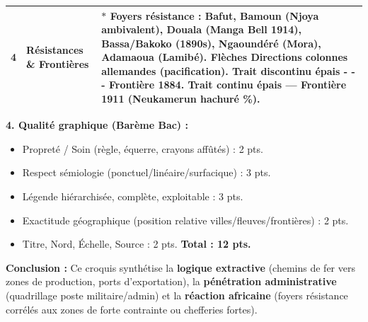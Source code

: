 \documentclass[11pt]{article}
\def\star{\mathbin{\ast}}\def\bigstar{\mathord{\ast}}%
\begin{document}
\begin{exoresolu}
\begin{center}
\begin{tabular}{|l|l|l|}
\hline
4 & \textbf{Résistances \& Frontières} & \textcolor{popred}{$\star$} Foyers résistance : Bafut, Bamoun (Njoya ambivalent), Douala (Manga Bell 1914), Bassa/Bakoko (1890s), Ngaoundéré (Mora), Adamaoua (Lamibé). \textcolor{popred}{\textbf{Flèches}} Directions colonnes allemandes (pacification). \textbf{Trait discontinu épais \textcolor{popblue}{- - -}} Frontière 1884. \textbf{Trait continu épais \textcolor{popdark}{—}} Frontière 1911 (Neukamerun hachuré \textcolor{popgray}{\%}). \\
\hline
\end{tabular}
\end{center}
\textbf{4. Qualité graphique (Barème Bac) :}
\begin{itemize}
    \item Propreté / Soin (règle, équerre, crayons affûtés) : 2 pts.
    \item Respect sémiologie (ponctuel/linéaire/surfacique) : 3 pts.
    \item Légende hiérarchisée, complète, exploitable : 3 pts.
    \item Exactitude géographique (position relative villes/fleuves/frontières) : 2 pts.
    \item Titre, Nord, Échelle, Source : 2 pts. \textbf{Total : 12 pts.}
\end{itemize}
\textbf{Conclusion :} Ce croquis synthétise la \textbf{logique extractive} (chemins de fer vers zones de production, ports d'exportation), la \textbf{pénétration administrative} (quadrillage poste militaire/admin) et la \textbf{réaction africaine} (foyers résistance corrélés aux zones de forte contrainte ou chefferies fortes).
\end{exoresolu}
\end{document}
